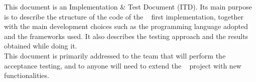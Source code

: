 This document is an Implementation \& Test Document (ITD). Its main purpose is to describe the structure of the code of the \projectname~ first implementation, together with the main development choices such as the programming language adopted and the frameworks used. It also describes the testing approach and the results obtained while doing it. \\
This document is primarily addressed to the team that will perform the acceptance testing, and to anyone will need to extend the \projectname~ project with new functionalities.